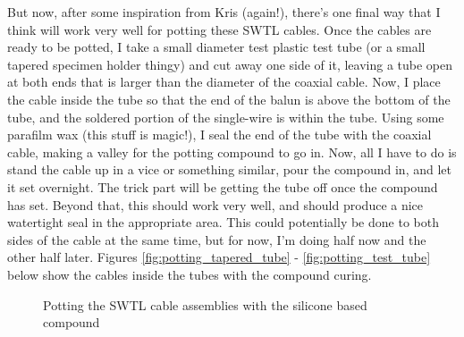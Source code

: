 \documentclass[12pt,onecolumn,titlepage]{article}
\begin{document}
But now, after some inspiration from Kris (again!), there's one final way that I think will work very well for potting these SWTL cables. Once the cables are ready to be potted, I take a small diameter test plastic test tube (or a small tapered specimen holder thingy) and cut away one side of it, leaving a tube open at both ends that is larger than the diameter of the coaxial cable. Now, I place the cable inside the tube so that the end of the balun is above the bottom of the tube, and the soldered portion of the single-wire is within the tube. Using some parafilm wax (this stuff is magic!), I seal the end of the tube with the coaxial cable, making a valley for the potting compound to go in. Now, all I have to do is stand the cable up in a vice or something similar, pour the compound in, and let it set overnight. The trick part will be getting the tube off once the compound has set. Beyond that, this should work very well, and should produce a nice watertight seal in the appropriate area. This could potentially be done to both sides of the cable at the same time, but for now, I'm doing half now and the other half later. Figures \ref{fig:potting_tapered_tube} - \ref{fig:potting_test_tube} below show the cables inside the tubes with the compound curing. 



\begin{figure}[htbp]
	\centering
		\quad
	\label{fig:potting_cables}
	\caption{Potting the SWTL cable assemblies with the silicone based compound }
\end{figure}
\end{document}
